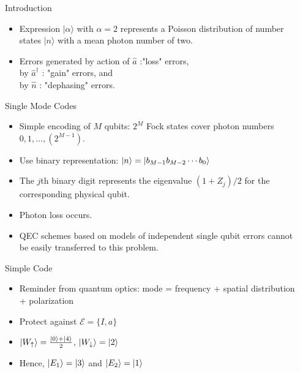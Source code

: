 \documentclass[8pt,final,hyperref={pdfpagelabels=false}]{beamer}
\theoremstyle{plain}
\newcommand\0{\mathbf{0}}
\begin{document}
\begin{frame}
\begin{columns}[t]
\begin{column}{.23\textwidth}
\begin{block}{Introduction}
\begin{itemize}
\item Expression ${\displaystyle |\alpha \rangle } $  with $\alpha = 2$ represents a Poisson distribution of number states ${\displaystyle |n\rangle }$  with a mean photon number of two. 
\item Errors generated by action of $\hat{a}$ :"loss" errors,\\ by $\hat{a}^\dag$ : "gain" errors, and \\ by $\hat{n}$ : "dephasing" errors. 
\end{itemize}
\end{block}
\begin{block}{Single Mode Codes}
\begin{itemize}
\item Simple encoding of $M$ qubits: $2^M$ Fock states cover photon numbers $0, 1, . . . , (2^{M - 1})$.
\item Use binary representation: $\ket{n} = \ket{b_{M-1} b_{M-2} \cdots b_0 }$
\item The $j$th binary digit represents the eigenvalue $(1 + Z_j)/2$ for the corresponding physical qubit. 
\item Photon loss occurs.
\item QEC schemes based on models of independent single qubit errors cannot be easily transferred to this problem.

\end{itemize}
    \end{block}
\begin{block}{Simple Code }
          \begin{itemize}
\item Reminder from quantum optics: mode = frequency + spatial distribution + polarization
\item Protect against $\mathcal{E} = \{ I,a\}$
\item $\ket{W_\uparrow} = \frac{\ket{0} + \ket{4}}{2}$, $\ket{W_\downarrow} = \ket{2}$
\item Hence, $\ket{E_1} = \ket{3}$ and $\ket{E_2} = \ket{1}$



\end{itemize}
\end{block}
\end{column}

\begin{column}{.23\textwidth} %
    

\end{column}
\end{columns}
\end{frame}
\end{document}
